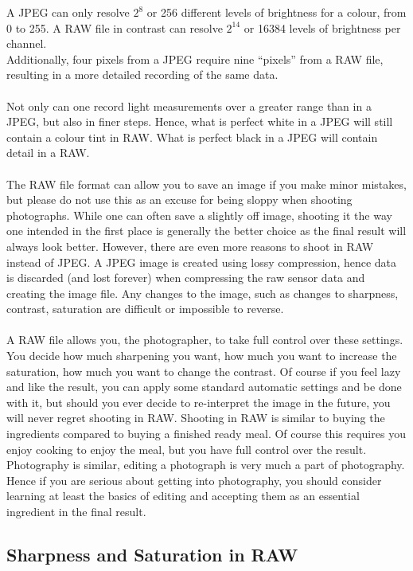 A \gls{JPEG} can only resolve $2^{8}$ or 256 different levels of brightness for a colour, from 0 to 255. A \gls{RAW} file in contrast can resolve $2^{14}$ or 16384 levels of brightness per channel.
\\
Additionally, four pixels from a \gls{JPEG} require nine ``pixels'' from a \gls{RAW} file, resulting in a more detailed recording of the same data.
\\
\\
Not only can one record light measurements over a greater range than in a \gls{JPEG}, but also in finer steps. Hence, what is perfect white in a \gls{JPEG} will still contain a colour tint in \gls{RAW}. What is perfect black in a \gls{JPEG} will contain detail in a \gls{RAW}.
\\
\\
The \gls{RAW} file format can allow you to save an image if you make minor mistakes, but please do not use this as an excuse for being sloppy when shooting photographs. While one can often save a slightly off image, shooting it the way one intended in the first place is generally the better choice as the final result will always look better. However, there are even more reasons to shoot in \gls{RAW} instead of \gls{JPEG}. A \gls{JPEG} image is created using lossy compression, hence data is discarded (and lost forever) when compressing the raw \gls{sensor} data and creating the image file. Any changes to the image, such as changes to sharpness, contrast, saturation are difficult or impossible to reverse.
\\
\\
A \gls{RAW} file allows you, the photographer, to take full control over these settings. You decide how much sharpening you want, how much you want to increase the saturation, how much you want to change the contrast. Of course if you feel lazy and like the result, you can apply some standard automatic settings and be done with it, but should you ever decide to re-interpret the image in the future, you will never regret shooting in \gls{RAW}. Shooting in \gls{RAW} is similar to buying the ingredients compared to buying a finished ready meal. Of course this requires you enjoy cooking to enjoy the meal, but you have full control over the result. Photography is similar, editing a photograph is very much a part of photography. Hence if you are serious about getting into photography, you should consider learning at least the basics of editing and accepting them as an essential ingredient in the final result.


\subsection{Sharpness and Saturation in RAW}

